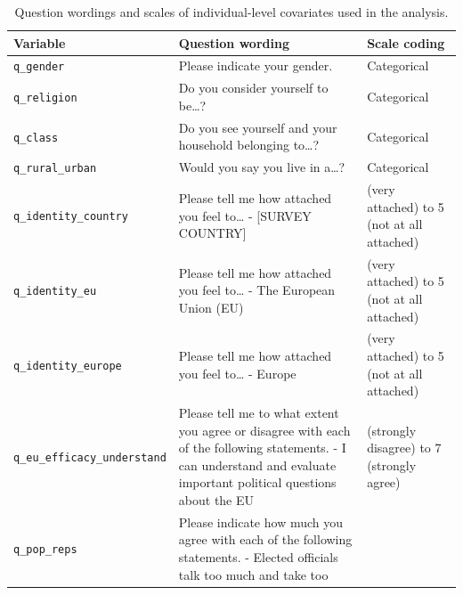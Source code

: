 \documentclass[
  10pt,
  a4paper,
  DIV=11,
  numbers=noendperiod]{scrartcl}
\begin{document}
{

\begin{longtable}[]{@{}
  >{\raggedright\arraybackslash}p{}
  >{\raggedright\arraybackslash}p{}
  >{\raggedright\arraybackslash}p{}@{}}

\caption{\label{tbl-wordings}Question wordings and scales of
individual-level covariates used in the analysis.}

\tabularnewline

\toprule\noalign{}
\begin{minipage}[b]{\linewidth}\raggedright
Variable
\end{minipage} & \begin{minipage}[b]{\linewidth}\raggedright
Question wording
\end{minipage} & \begin{minipage}[b]{\linewidth}\raggedright
Scale coding
\end{minipage} \\
\midrule\noalign{}
\endhead
\bottomrule\noalign{}
\endlastfoot
\texttt{q\_gender} & Please indicate your gender. & Categorical \\
\texttt{q\_religion} & Do you consider yourself to be\ldots? &
Categorical \\
\texttt{q\_class} & Do you see yourself and your household belonging
to\ldots? & Categorical \\
\texttt{q\_rural\_urban} & Would you say you live in a\ldots? &
Categorical \\
\texttt{q\_identity\_country} & Please tell me how attached you feel
to\ldots{} - {[}SURVEY COUNTRY{]} & 1 (very attached) to 5 (not at all
attached) \\
\texttt{q\_identity\_eu} & Please tell me how attached you feel
to\ldots{} - The European Union (EU) & 1 (very attached) to 5 (not at
all attached) \\
\texttt{q\_identity\_europe} & Please tell me how attached you feel
to\ldots{} - Europe & 1 (very attached) to 5 (not at all attached) \\
\texttt{q\_eu\_efficacy\_understand} & Please tell me to what extent you
agree or disagree with each of the following statements. - I can
understand and evaluate important political questions about the EU & 1
(strongly disagree) to 7 (strongly agree) \\
\texttt{q\_pop\_reps} & Please indicate how much you agree with each of
the following statements. - Elected officials talk too much and take too

\end{longtable}}
\end{document}
